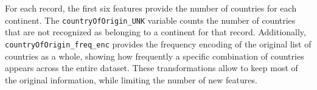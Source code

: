 For each record, the first six features provide the number of countries for each continent.
The \texttt{countryOfOrigin\_UNK} variable counts the number of countries that are not recognized as
belonging to a continent for that record.
Additionally, \texttt{countryOfOrigin\_freq\_enc} provides the frequency encoding of the original list of countries as a whole, 
showing how frequently a specific combination of countries appears across the entire dataset.
These transformations allow to keep most of the original information, while limiting the number of new features.




